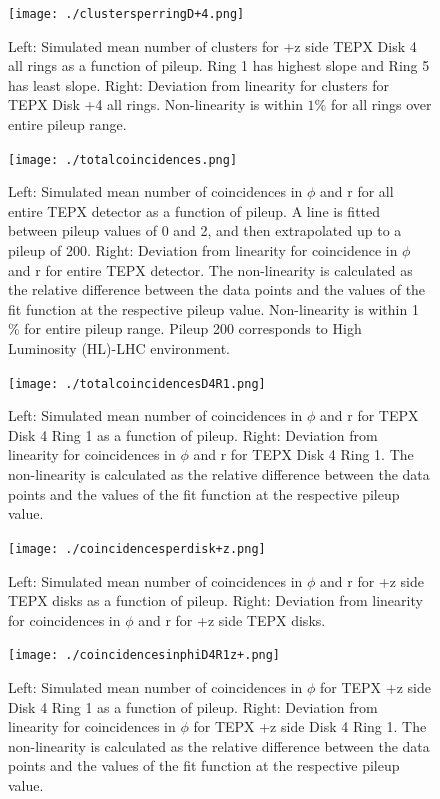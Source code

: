 \begin{figure}[H]
  \centering
  \texttt{[image: ./clustersperringD+4.png]}
  \caption{Left: Simulated mean number of clusters for +z side TEPX Disk 4 all rings as a function of pileup. Ring 1 has highest slope and Ring 5 has least slope. Right: Deviation from linearity for clusters for TEPX Disk +4 all rings. Non-linearity is within $1\%$ for all rings over entire pileup range.}
  \label{fig:CMS}
\end{figure}


\begin{figure}[H]
  \centering
  \texttt{[image: ./totalcoincidences.png]}
  \caption{Left: Simulated mean number of coincidences in $\phi$ and r for all entire TEPX detector as a function of pileup. A line is fitted between pileup values of 0 and 2, and then extrapolated up to a pileup of 200. Right: Deviation from linearity for coincidence in $\phi$ and r for entire TEPX detector. The non-linearity is calculated as the relative difference between the data points and the values of the fit function at the respective pileup value. Non-linearity is within 1 \% for entire pileup range. Pileup 200 corresponds to High Luminosity (HL)-LHC environment.}
  \label{fig:CMS}
\end{figure}


\begin{figure}[H]
  \centering
  \texttt{[image: ./totalcoincidencesD4R1.png]}
  \caption{Left: Simulated mean number of coincidences in $\phi$ and r for TEPX Disk 4 Ring 1 as a function of pileup. Right: Deviation from linearity for coincidences in $\phi$ and r for TEPX Disk 4 Ring 1. The non-linearity is calculated as the relative difference between the data points and the values of the fit function at the respective pileup value.}
  \label{fig:CMS}
\end{figure}





\begin{figure}[H]
  \centering
  \texttt{[image: ./coincidencesperdisk+z.png]}
  \caption{Left: Simulated mean number of coincidences in $\phi$ and r for +z side TEPX disks as a function of pileup. Right: Deviation from linearity for coincidences in $\phi$ and r for +z side TEPX disks.}
  \label{fig:CMS}
\end{figure}


\begin{figure}[H]
  \centering
  \texttt{[image: ./coincidencesinphiD4R1z+.png]}
  \caption{Left: Simulated mean number of coincidences in $\phi$ for TEPX +z side Disk 4 Ring 1 as a function of pileup. Right: Deviation from linearity for coincidences in $\phi$ for TEPX +z side Disk 4 Ring 1. The non-linearity is calculated as the relative difference between the data points and the values of the fit function at the respective pileup value.}
  \label{fig:CMS}
\end{figure}



